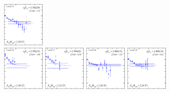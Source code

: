 \begin{figure}[H]
    \includegraphics[width=0.18\textwidth]{figures/sigmas/hg/fits/fit_18.pdf}\\
    \includegraphics[width=0.18\textwidth]{figures/sigmas/hg/fits/fit_31.pdf}
    \includegraphics[width=0.18\textwidth]{figures/sigmas/hg/fits/fit_33.pdf}
    \includegraphics[width=0.18\textwidth]{figures/sigmas/hg/fits/fit_13.pdf}
    \includegraphics[width=0.18\textwidth]{figures/sigmas/hg/fits/fit_22.pdf}\\

\end{figure}
